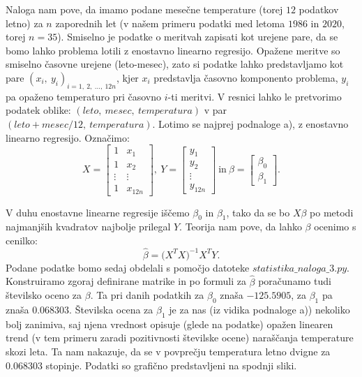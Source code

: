 \documentclass{article}
\begin{document}
Naloga nam pove, da imamo podane mesečne temperature (torej $12$ podatkov letno) za $n$ zaporednih let (v našem primeru podatki med letoma $1986$ in $2020$, torej $n = 35$).
Smiselno je podatke o meritvah zapisati kot urejene pare, da se bomo lahko problema lotili z enostavno linearno regresijo.
Opažene meritve so smiselno časovne urejene (leto-mesec), zato si podatke lahko predstavljamo kot pare $(x_i,~y_i)_{i=1,~2,~\dots,~12n}$, kjer $x_i$ predstavlja časovno komponento problema, $y_i$ pa opaženo temperaturo pri časovno $i$-ti meritvi. 
V resnici lahko le pretvorimo podatek oblike: $(leto,~mesec,~temperatura)$ v par $(leto + mesec/12,~temperatura)$.
Lotimo se najprej podnaloge a), z enostavno linearno regresijo.
Označimo:
$$
    X = \begin{bmatrix}
        1 & x_1\\ 
        1 & x_2 \\
        \vdots & \vdots\\ 
        1 & x_{12n}
    \end{bmatrix}, ~
    Y = \begin{bmatrix}
        y_1 \\ 
        y_2 \\
        \vdots \\ 
        y_{12n}
    \end{bmatrix}~\text{in}~ 
    \beta = \begin{bmatrix}
        \beta_0 \\ 
        \beta_1
    \end{bmatrix}.   
$$

V duhu enostavne linearne regresije iščemo $\beta_0$ in $\beta_1$, tako da se bo $X \beta$ po metodi najmanjših kvadratov najbolje prilegal $Y$.
Teorija nam pove, da lahko $\beta$ ocenimo s cenilko:
$$
    \hat{\beta} = \Big(X^{T}X\Big)^{-1}X^{T}Y.
$$
Podane podatke bomo sedaj obdelali s pomočjo datoteke $statistika\_naloga\_3.py$. 
Konstruiramo zgoraj definirane matrike in po formuli za $\hat{\beta}$ poračunamo tudi številsko oceno za $\beta$. Ta pri danih podatkih za $\beta_0$ znaša $-125.5905$, za $\beta_1$ pa znaša $0.068303$.
\newline
Številska ocena za $\beta_1$ je za nas (iz vidika podnaloge a)) nekoliko bolj zanimiva, saj njena vrednost opisuje (glede na podatke) opažen linearen trend (v tem primeru zaradi pozitivnosti številske ocene) naraščanja temperature skozi leta.
Ta nam nakazuje, da se v povprečju temperatura letno dvigne za $0.068303$ stopinje. 
Podatki so grafično predstavljeni na spodnji sliki. 
\end{document}
